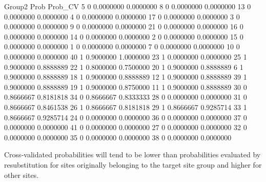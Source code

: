 \documentclass[11pt,a4paper]{article}
\begin{document}
\begin{Schunk}
\begin{Soutput}
   Group2      Prob   Prob_CV
5       0 0.0000000 0.0000000
8       0 0.0000000 0.0000000
13      0 0.0000000 0.0000000
4       0 0.0000000 0.0000000
17      0 0.0000000 0.0000000
3       0 0.0000000 0.0000000
9       0 0.0000000 0.0000000
21      0 0.0000000 0.0000000
16      0 0.0000000 0.0000000
14      0 0.0000000 0.0000000
2       0 0.0000000 0.0000000
15      0 0.0000000 0.0000000
1       0 0.0000000 0.0000000
7       0 0.0000000 0.0000000
10      0 0.0000000 0.0000000
40      1 0.9000000 1.0000000
23      1 0.0000000 0.0000000
25      1 0.9000000 0.8888889
22      1 0.8000000 0.7500000
20      1 0.9000000 0.8888889
6       1 0.9000000 0.8888889
18      1 0.9000000 0.8888889
12      1 0.9000000 0.8888889
39      1 0.9000000 0.8888889
19      1 0.9000000 0.8750000
11      1 0.9000000 0.8888889
30      0 0.8666667 0.8181818
34      0 0.8666667 0.8333333
28      0 0.0000000 0.0000000
31      0 0.8666667 0.8461538
26      1 0.8666667 0.8181818
29      1 0.8666667 0.9285714
33      1 0.8666667 0.9285714
24      0 0.0000000 0.0000000
36      0 0.0000000 0.0000000
37      0 0.0000000 0.0000000
41      0 0.0000000 0.0000000
27      0 0.0000000 0.0000000
32      0 0.0000000 0.0000000
35      0 0.0000000 0.0000000
38      0 0.0000000 0.0000000
\end{Soutput}
\end{Schunk}
Cross-validated probabilities will tend to be lower than probabilities evaluated by resubstitution for sites originally belonging to the target site group and higher for other sites.


\end{document}
